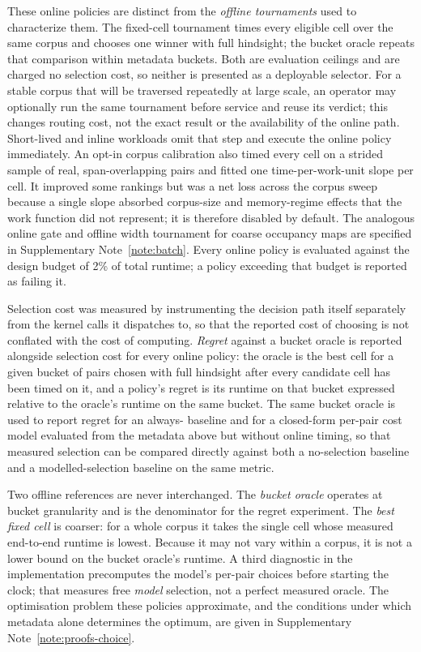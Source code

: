 These online policies are distinct from the \emph{offline tournaments} used to characterize them.
The fixed-cell tournament times every eligible cell over the same corpus and chooses one winner with
full hindsight; the bucket oracle repeats that comparison within metadata buckets. Both are
evaluation ceilings and are charged no selection cost, so neither is presented as a deployable
selector. For a stable corpus that will be traversed repeatedly at large scale, an operator may
optionally run the same tournament before service and reuse its verdict; this changes routing cost,
not the exact result or the availability of the online path. Short-lived and inline workloads omit
that step and execute the online policy immediately. An opt-in corpus calibration also timed every
cell on a strided sample of real,
span-overlapping pairs and fitted one time-per-work-unit slope per cell. It improved some rankings but
was a net loss across the corpus sweep because a single slope absorbed corpus-size and memory-regime
effects that the work function did not represent; it is therefore disabled by default. The analogous
online gate and offline width tournament for coarse occupancy maps are specified in Supplementary
Note~\ref{note:batch}. Every online policy is evaluated against the design budget of 2\% of total
runtime; a policy exceeding that budget is reported as failing it.

Selection cost was measured by instrumenting the decision path itself separately from the kernel calls
it dispatches to, so that the reported cost of choosing is not conflated with the cost of computing.
\emph{Regret} against a bucket oracle is reported alongside selection cost for every online policy: the
oracle is the best cell for a given bucket of pairs chosen with full hindsight after every candidate
cell has been timed on it, and a policy's regret is its runtime on that bucket expressed relative to
the oracle's runtime on the same bucket. The same bucket oracle is used to report regret for an
always-\rB{} baseline and for a closed-form per-pair cost model evaluated from the metadata above but
without online timing, so that measured selection can be compared directly against both a
no-selection baseline and a modelled-selection baseline on the same metric.

Two offline references are never interchanged. The \emph{bucket oracle} operates at bucket
granularity and is the denominator for the regret experiment. The \emph{best fixed cell} is coarser:
for a whole corpus it takes the single cell whose measured end-to-end runtime is lowest. Because it
may not vary within a corpus, it is not a lower bound on the bucket oracle's runtime. A third
diagnostic in the implementation precomputes the model's per-pair choices before starting the clock;
that measures free \emph{model} selection, not a perfect measured oracle. The optimisation problem
these policies approximate, and the conditions under which metadata alone determines the optimum,
are given in Supplementary Note~\ref{note:proofs-choice}.

